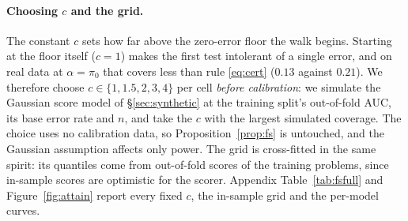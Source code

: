 \documentclass[twoside]{article}
\theoremstyle{remark}
\newcommand{\pizero}{\pi_0}
\begin{document}


\paragraph{Choosing $c$ and the grid.} The constant $c$ sets how far above the zero-error floor the walk begins. Starting at the floor itself ($c=1$) makes the first test intolerant of a single error, and on real data at $\alpha=\pizero$ that covers less than rule \eqref{eq:cert} ($0.13$ against $0.21$). We therefore choose $c\in\{1,1.5,2,3,4\}$ per cell \emph{before calibration}: we simulate the Gaussian score model of \S\ref{sec:synthetic} at the training split's out-of-fold AUC, its base error rate and $n$, and take the $c$ with the largest simulated coverage. The choice uses no calibration data, so Proposition~\ref{prop:fs} is untouched, and the Gaussian assumption affects only power. The grid is cross-fitted in the same spirit: its quantiles come from out-of-fold scores of the training problems, since in-sample scores are optimistic for the scorer. Appendix Table~\ref{tab:fsfull} and Figure~\ref{fig:attain} report every fixed $c$, the in-sample grid and the per-model curves.
\end{document}
